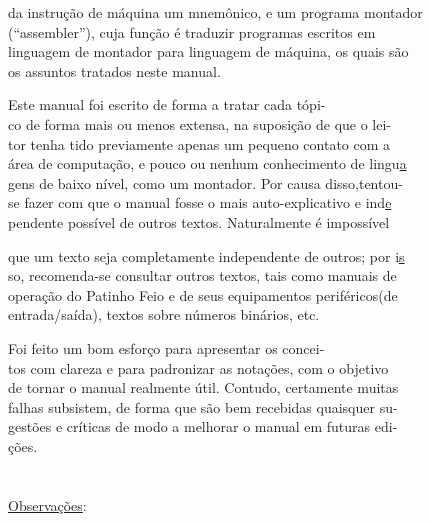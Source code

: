 \documentclass[a4paper,12pt]{article}
\begin{document}
da instrução de máquina um mnemônico, e um programa \hfill montador\\
(``assembler''), cuja função é traduzir programas escritos \hfill em\\
linguagem de montador para linguagem de máquina, os quais \hfill são\\
os assuntos tratados neste manual.\\
\par
Este manual foi escrito de forma a tratar cada tópi-\\
co de forma mais ou menos extensa, na suposição de que o \hfill lei-\\
tor tenha tido previamente apenas um pequeno contato com \hfill a\\
área de computação, e pouco ou nenhum conhecimento de \hfill lingu\uline a\\
gens de baixo nível, como um montador. Por causa disso,tentou-\\
se fazer com que o manual fosse o mais auto-explicativo e ind\uline e\\
pendente possível de outros textos. Naturalmente é \hfill impossível

\newpage

\noindent que um texto seja completamente independente de outros; por i\uline s\\
so, recomenda-se consultar outros textos, tais como manuais de\\
operação do Patinho Feio e de seus equipamentos periféricos(de\\
entrada/saída), textos sobre números binários, etc.\\
\par
Foi feito um bom esforço para apresentar os \hfill concei-\\
tos com clareza e para padronizar as notações, com o \hfill objetivo\\
de tornar o manual realmente útil. Contudo, certamente \hfill muitas\\
falhas subsistem, de forma que são bem recebidas quaisquer su-\\
gestões e críticas de modo a melhorar o manual em futuras edi-\\
ções.\\
\\
\\[-0.5em]
\uline{Observações}:
\end{document}
